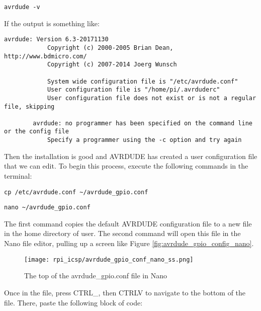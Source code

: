     \begin{lstlisting}[style=kaolstplain,linewidth=1.5\textwidth]
        avrdude -v
    \end{lstlisting}

    If the output is something like:

    \begin{lstlisting}[style=kaolstplain,linewidth=1.5\textwidth]
        avrdude: Version 6.3-20171130
            Copyright (c) 2000-2005 Brian Dean, http://www.bdmicro.com/
            Copyright (c) 2007-2014 Joerg Wunsch

            System wide configuration file is "/etc/avrdude.conf"
            User configuration file is "/home/pi/.avrduderc"
            User configuration file does not exist or is not a regular file, skipping

        avrdude: no programmer has been specified on the command line or the config file
            Specify a programmer using the -c option and try again
    \end{lstlisting}

    Then the installation is good and AVRDUDE has created a user configuration file that we can edit. To begin this process, execute the following commands in the terminal:

    \begin{lstlisting}[style=kaolstplain,linewidth=1.5\textwidth]
        cp /etc/avrdude.conf ~/avrdude_gpio.conf
    \end{lstlisting}

    \begin{lstlisting}[style=kaolstplain,linewidth=1.5\textwidth]
        nano ~/avrdude_gpio.conf
    \end{lstlisting}

    The first command copies the default AVRDUDE configuration file to a new file in the home directory of user. The second command will open this file in the Nano file editor, pulling up a screen like Figure \ref{fig:avrdude_gpio_config_nano}.
    
    \begin{figure}[h!]
        \texttt{[image: rpi\_icsp/avrdude\_gpio\_conf\_nano\_ss.png]}
        \caption[AVRDUDE GPIO config file open in Nano]{The top of the avrdude\_gpio.conf file in Nano}
    \end{figure}

    Once in the file, press CTRL\+\_, then CTRL\+V to navigate to the bottom of the file. There, paste the following block of code:


